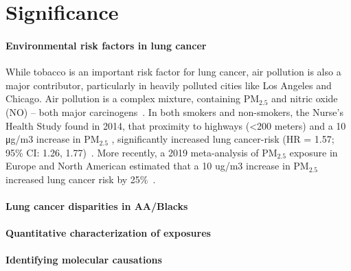 \section{Significance}





\paragraph{Environmental risk factors in lung cancer}



While tobacco is an important risk factor for lung cancer, air pollution is also a major contributor, 
particularly in heavily polluted cities like Los Angeles and Chicago. 
Air pollution is a complex mixture, containing PM$_{2.5}$ and nitric oxide (NO) – both major carcinogens~\cite{}. 
In both smokers and non-smokers, the Nurse’s Health Study found in 2014, that proximity to highways (<200 meters) 
and a 10 μg/m3 increase in PM$_{2.5}$ , significantly increased lung cancer-risk (HR = 1.57; 95\% CI: 1.26, 1.77)~\cite{}.  
More recently, a 2019 meta-analysis of PM$_{2.5}$ exposure in Europe and North American estimated that a 10 ug/m3 increase in PM$_{2.5}$ increased lung cancer risk by 25\%~\cite{}.


\paragraph{Lung cancer disparities in AA/Blacks}

\lipsum[4-5]

\paragraph{Quantitative characterization of exposures}

\lipsum[6-10]
 
 \paragraph{Identifying molecular causations}